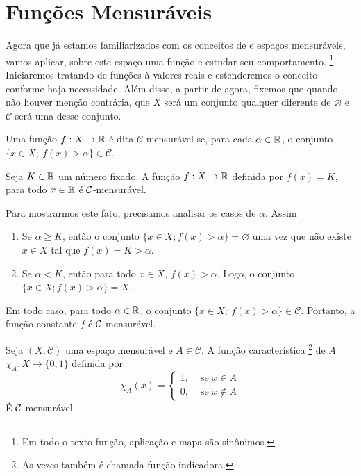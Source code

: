 \section{Funções Mensuráveis}


Agora que já estamos familiarizados com os conceitos de \sigal e espaços mensuráveis, vamos aplicar, sobre este espaço uma função e estudar seu comportamento.
\footnote{Em todo o texto função, aplicação e mapa são sinônimos.}
Iniciaremos tratando de funções à valores reais e estenderemos o conceito conforme haja necessidade.
Além disso, a partir de agora, fixemos que quando não houver menção contrária,  que $X$ será um conjunto qualquer diferente de $\varnothing$ e $\mathcal{C}$ será uma \sigal desse conjunto. 

\begin{definition}
	\label{def:mensurabilidade-funções-reais}
    Uma função $f: X \to \mathbb{R} $ é dita $\mathcal{C}$-mensurável se, para cada $\alpha \in \mathbb{R}$, o conjunto $\{x \in X;\ f(x) > \alpha\} \in \mathcal{C}$.
\end{definition}


\begin{example}
\label{ex:funcao-constante}
	Seja $K \in \mathbb{R}$ um número fixado. 
	A função $f: X \to \mathbb{R}$ definida por $f(x) = K$, para todo $x \in \mathbb{R}$  é $\operatorname{\mathcal{C}}$-mensurável.
\end{example}
Para mostrarmos este fato, precisamos analisar os casos de $\alpha$.
Assim
	\begin{enumerate}[label*= (\Roman*)]
		\item Se $\alpha \geq K$, então o conjunto $\{x \in X; f(x) > \alpha\} = \varnothing$ uma vez que não existe $x \in X$ tal que $f(x)= K > \alpha$.
		\item Se $\alpha < K$, então para todo $x \in X$, $f(x) > \alpha$.
		Logo, o conjunto $\{x \in X; f(x) > \alpha\} = X$.
	\end{enumerate}
Em todo caso, para todo $\alpha \in \mathbb{R}$, o conjunto  $\{x \in X;\ f(x) > \alpha\} \in \mathcal{C}$.
Portanto, a função constante $f$ é $\operatorname{\mathcal{C}}$-mensurável.
\begin{example}
    Seja $(X, \mathcal{C})$ uma espaço mensurável e $A \in \mathcal{C}$.
    A função característica \footnote{As vezes também é chamada  função indicadora.} de $A$ 
    $\chi_A: X \to \{0,1\}$ definida por 
    $$\chi_A(x) =\left\{\begin{array}{cc}
         1, & \textrm{\ se \ } x \in A \\
         0, & \textrm{\ se \ } x \notin A
    \end{array}\right.
    $$
    É $\operatorname{\mathcal{C}}$-mensurável.
\end{example}

